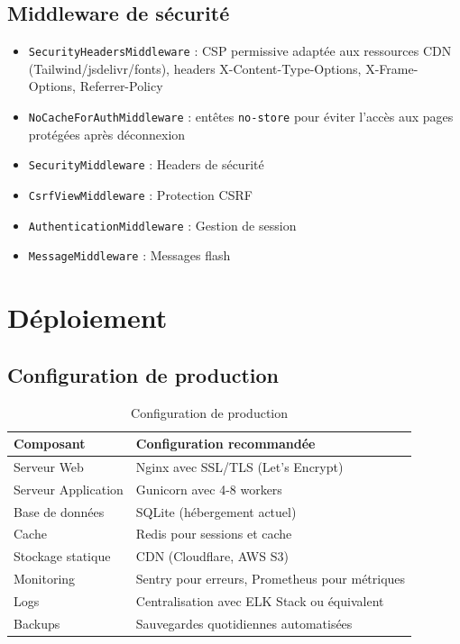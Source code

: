 \documentclass[12pt,a4paper]{report}
\begin{document}
\subsection{Middleware de sécurité}
\begin{itemize}[leftmargin=1.5cm]
    \item \texttt{SecurityHeadersMiddleware} : CSP permissive adaptée aux ressources CDN (Tailwind/jsdelivr/fonts), headers X-Content-Type-Options, X-Frame-Options, Referrer-Policy
    \item \texttt{NoCacheForAuthMiddleware} : entêtes \texttt{no-store} pour éviter l'accès aux pages protégées après déconnexion
    \item \texttt{SecurityMiddleware} : Headers de sécurité
    \item \texttt{CsrfViewMiddleware} : Protection CSRF
    \item \texttt{AuthenticationMiddleware} : Gestion de session
    \item \texttt{MessageMiddleware} : Messages flash
\end{itemize}

\section{Déploiement}

\subsection{Configuration de production}
\begin{table}[H]
\centering
\begin{tabular}{|p{5cm}|p{9cm}|}
\hline
\rowcolor{banquiseblue!30}
\textbf{Composant} & \textbf{Configuration recommandée} \\
\hline
Serveur Web & Nginx avec SSL/TLS (Let's Encrypt) \\
\hline
Serveur Application & Gunicorn avec 4-8 workers \\
\hline
Base de données & SQLite (hébergement actuel) \\
\hline
Cache & Redis pour sessions et cache \\
\hline
Stockage statique & CDN (Cloudflare, AWS S3) \\
\hline
Monitoring & Sentry pour erreurs, Prometheus pour métriques \\
\hline
Logs & Centralisation avec ELK Stack ou équivalent \\
\hline
Backups & Sauvegardes quotidiennes automatisées \\
\hline
\end{tabular}
\caption{Configuration de production}
\end{table}
\end{document}
